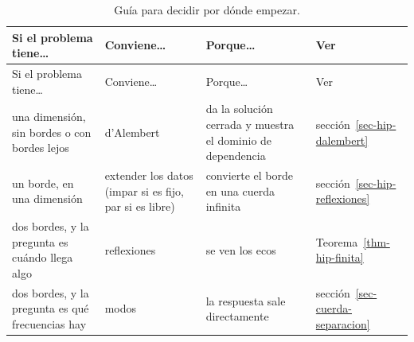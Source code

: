 \documentclass[
  spanish,
  a4paper,
]{scrbook}
\theoremstyle{definition}
\theoremstyle{plain}
\theoremstyle{definition}
\theoremstyle{plain}
\theoremstyle{definition}
\theoremstyle{remark}
\begin{document}
\begin{longtable}[]{@{}
  >{\raggedright\arraybackslash}p{}
  >{\raggedright\arraybackslash}p{}
  >{\raggedright\arraybackslash}p{}
  >{\raggedright\arraybackslash}p{}@{}}
\caption{Guía para decidir por dónde
empezar.}\label{tbl-hip-elegir}\tabularnewline
\toprule\noalign{}
\begin{minipage}[b]{\linewidth}\raggedright
Si el problema tiene\ldots{}
\end{minipage} & \begin{minipage}[b]{\linewidth}\raggedright
Conviene\ldots{}
\end{minipage} & \begin{minipage}[b]{\linewidth}\raggedright
Porque\ldots{}
\end{minipage} & \begin{minipage}[b]{\linewidth}\raggedright
Ver
\end{minipage} \\
\midrule\noalign{}
\endfirsthead
\toprule\noalign{}
\begin{minipage}[b]{\linewidth}\raggedright
Si el problema tiene\ldots{}
\end{minipage} & \begin{minipage}[b]{\linewidth}\raggedright
Conviene\ldots{}
\end{minipage} & \begin{minipage}[b]{\linewidth}\raggedright
Porque\ldots{}
\end{minipage} & \begin{minipage}[b]{\linewidth}\raggedright
Ver
\end{minipage} \\
\midrule\noalign{}
\endhead
\bottomrule\noalign{}
\endlastfoot
una dimensión, sin bordes o con bordes lejos & d'Alembert & da la
solución cerrada y muestra el dominio de dependencia &
sección~\ref{sec-hip-dalembert} \\
un borde, en una dimensión & extender los datos (impar si es fijo, par
si es libre) & convierte el borde en una cuerda infinita &
sección~\ref{sec-hip-reflexiones} \\
dos bordes, y la pregunta es cuándo llega algo & reflexiones & se ven
los ecos & Teorema~\ref{thm-hip-finita} \\
dos bordes, y la pregunta es qué frecuencias hay & modos & la respuesta
sale directamente & sección~\ref{sec-cuerda-separacion} \\

\end{longtable}
\end{document}
